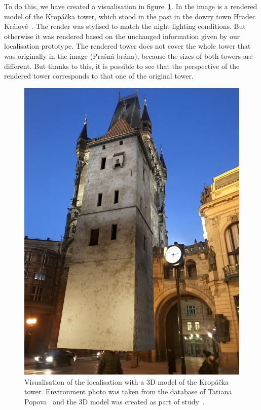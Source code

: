 \documentclass[thesis=B,english]{FITthesis}[2019/12/23]
\begin{document}
        To do this, we have created a visualisation in figure~\ref{fig:prasnaKropacka}. In the image is a rendered model of the Kropáčka tower, which stood in the past in the dowry town Hradec Králové~\cite{Vojtiskova2019}. The render was stylised to match the night lighting conditions. But otherwise it was rendered based on the unchanged information given by our localisation prototype. The rendered tower does not cover the whole tower that was originally in the image (Prašná brána), because the sizes of both towers are different. But thanks to this, it is possible to see that the perspective of the rendered tower corresponds to that one of the original tower.
        
        \begin{figure}
            \centering
            \includegraphics[width = 0.64\linewidth] {pictures/future/Kropatschka_Tower_instead_of_Prasna_Gate_small.jpg}
            \caption[Visualisation of the localisation with a 3D model of a tower Kropáčka]{Visualisation of the localisation with a 3D model of the Kropáčka tower. Environment photo was taken from the database of Tatiana Popova~\cite{Popova2021} and the 3D model was created as part of study~\cite{Vojtiskova2019}.}
            \label{fig:prasnaKropacka}
        \end{figure}
        
\end{document}
